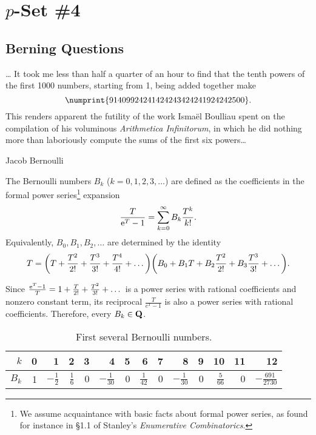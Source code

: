 %
%
%
\chapter*{$p$-Set \#4}

\section*{Berning Questions}

\setlength{\epigraphwidth}{0.55\textwidth}  
\epigraph{\dots\! It took me less than half a quarter
of an hour to find that the tenth powers of the first 1000 numbers, starting from 1, being added together make
$$\numprint{91409924241424243424241924242500}.
$$ 
This renders apparent the futility of the work Isma\"{e}l Boulliau spent on the compilation of his voluminous \emph{Arithmetica
Infinitorum}, in which he did nothing more than laboriously compute the sums of the first six powers\dots}{Jacob Bernoulli}
\setlength{\epigraphwidth}{0.45\textwidth} 

The \textsf{Bernoulli numbers $B_k$} ($k=0,1,2,3,\dots$) are defined as the coefficients in the formal power series\footnote{We assume acquaintance with basic facts about formal power series, as found for instance in \S1.1 of Stanley's \emph{Enumerative Combinatorics}.} expansion 
\[ \frac{T}{\mathrm{e}^{T}-1} = \sum_{k=0}^{\infty} B_k \frac{T^k}{k!}. \]
Equivalently, $B_0, B_1, B_2, \dots$ are determined by the identity
\[ T= \bigg(T + \frac{T^2}{2!} + \frac{T^3}{3!} + \frac{T^4}{4!} + \dots\bigg) \bigg(B_0 + B_1 T + B_2 \frac{T^2}{2!} + B_3 \frac{T^3}{3!}+\dots\bigg).\index{$B_k$|see{Bernoulli numbers}}\]

Since $\frac{\mathrm{e}^{T}-1}{T}= 1 + \frac{T}{2!} + \frac{T^2}{3!} + \dots$ is a power series with rational coefficients and nonzero constant term, its reciprocal $\frac{T}{e^T-1}$ is also a power series with rational coefficients. Therefore, every $B_k\in \mathbf{Q}$. 

\begin{table}[t]
    \centering
    \setlength\tabcolsep{6.25pt}
    \begin{tabular}{r||r r r r r r r r r r r r r}       $k$  & 0 &  1&  2 &  3 & 4 & 5 & 6 & 7 & 8 & 9 & 10 & 11 & 12\\\midrule
       $B_k$  & 1 & $-\frac12$  & $\frac16$  &  $0$ & $-\frac{1}{30}$ & $0$ & $\frac{1}{42}$ & $0$ & $-\frac{1}{30}$ & $0$ & $\frac{5}{66}$ & $0$ & $-\frac{691}{2730}$\\
    \end{tabular}
    \caption*{First several Bernoulli numbers.}
\end{table} 


